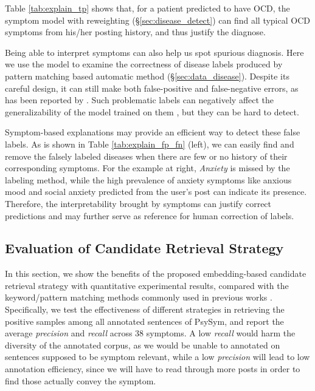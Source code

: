 Table \ref{tab:explain_tp} shows that, for a patient predicted to have OCD, the symptom model with reweighting (\S \ref{sec:disease_detect}) can find all typical OCD symptoms from his/her posting history, and thus justify the diagnose.

Being able to interpret symptoms can also help us spot spurious diagnosis. Here we use the model to examine the correctness of disease labels produced by pattern matching based automatic method (\S \ref{sec:data_disease}). Despite its careful design, it can still make both false-positive and false-negative errors, as has been reported by \citet{cohan2018smhd}. Such problematic labels can negatively affect the generalizability of the model trained on them \citep{ernala2019methodological}, but they can be hard to detect. 

Symptom-based explanations may provide an efficient way to detect these false labels. As is shown in Table \ref{tab:explain_fp_fn} (left), we can easily find and remove the falsely labeled diseases when there are few or no history of their corresponding symptoms. For the example at right, \textit{Anxiety} is missed by the labeling method, while the high prevalence of anxiety symptoms like anxious mood and social anxiety predicted from the user's post can indicate its presence. Therefore, the interpretability brought by symptoms can justify correct predictions and may further serve as reference for human correction of labels.   

\subsection{Evaluation of Candidate Retrieval Strategy}
\label{sec:exp_retrieve}

In this section, we show the benefits of the proposed embedding-based candidate retrieval strategy with quantitative experimental results, compared with the keyword/pattern matching methods commonly used in previous works \citep{mowery2017understanding,yadav2020identifying}. Specifically, we test the effectiveness of different strategies in retrieving the positive samples among all annotated sentences of PsySym, and report the average \textit{precision} and \textit{recall} across 38 symptoms. A low \textit{recall} would harm the diversity of the annotated corpus, as we would be unable to annotated on sentences supposed to be symptom relevant, while a low \textit{precision} will lead to low annotation efficiency, since we will have to read through more posts in order to find those actually convey the symptom. 

